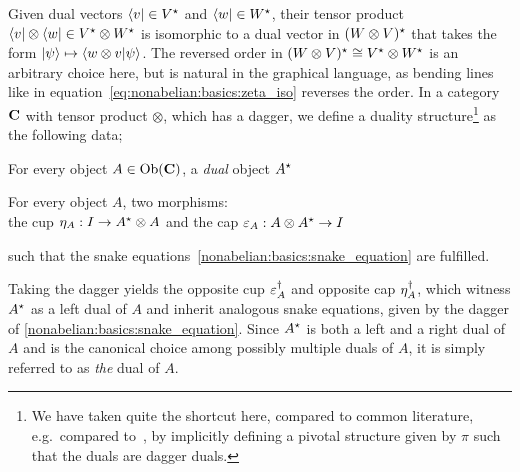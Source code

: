 \begin{doublecol}
    Given dual vectors $\bra{v} \in \dualspace{V}$ and $\bra{w} \in \dualspace{W}$, their tensor product $\bra{v} \otimes \bra{w} \in \dualspace{V}\otimes \dualspace{W}$ is isomorphic to a dual vector in $(W \otimes V)^\star$ that takes the form $\ket{\psi} \mapsto \braket{w \otimes v}{\psi}$.
    The reversed order in $(W \otimes V)^\star \cong V^\star \otimes W^\star$ is an arbitrary choice here, but is natural in the graphical language, as bending lines like in equation~\eqref{eq:nonabelian:basics:zeta_iso} reverses the order.
\colswitch
    In a category $\mathbf{C}$ with tensor product $\otimes$, which has a dagger, we define a duality structure\footnote{
        We have taken quite the shortcut here, compared to common literature, e.g.~compared to~\cite[chpt 3]{heunen2019}, by implicitly defining a pivotal structure given by $\pi$ such that the duals are dagger duals.
    } as the following data;
    \begin{halfcolitemize}
        \item For every object $A \in \mathrm{Ob}(\mathbf{C})$, a \emph{dual} object $A^\star$
        \item For every object $A$, two morphisms:\\ the cup $\eta_{A}: I \to A^\star \otimes A$ and the cap $\varepsilon_{A}: A \otimes A^\star \to I$
    \end{halfcolitemize}
    such that the snake equations~\eqref{nonabelian:basics:snake_equation} are fulfilled.
    
    Taking the dagger yields the opposite cup $\varepsilon_{A}^\dagger$ and opposite cap $\eta_{A}^\dagger$, which witness $A^\star$ as a left dual of $A$ and inherit analogous snake equations, given by the dagger of \eqref{nonabelian:basics:snake_equation}.
    Since $A^\star$ is both a left and a right dual of $A$ and is the canonical choice among possibly multiple duals of $A$, it is simply referred to as \emph{the} dual of $A$.


\end{doublecol}
